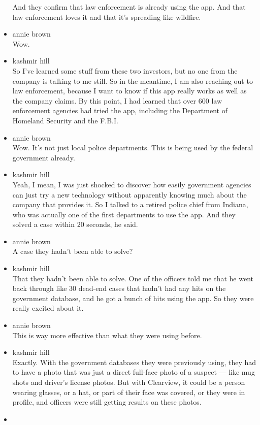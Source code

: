 \begin{itemize}
  And they confirm that law enforcement is already using the app. And
  that law enforcement loves it and that it's spreading like wildfire.
\item
  annie brown\\
  Wow.
\item
  kashmir hill\\
  So I've learned some stuff from these two investors, but no one from
  the company is talking to me still. So in the meantime, I am also
  reaching out to law enforcement, because I want to know if this app
  really works as well as the company claims. By this point, I had
  learned that over 600 law enforcement agencies had tried the app,
  including the Department of Homeland Security and the F.B.I.
\item
  annie brown\\
  Wow. It's not just local police departments. This is being used by the
  federal government already.
\item
  kashmir hill\\
  Yeah, I mean, I was just shocked to discover how easily government
  agencies can just try a new technology without apparently knowing much
  about the company that provides it. So I talked to a retired police
  chief from Indiana, who was actually one of the first departments to
  use the app. And they solved a case within 20 seconds, he said.
\item
  annie brown\\
  A case they hadn't been able to solve?
\item
  kashmir hill\\
  That they hadn't been able to solve. One of the officers told me that
  he went back through like 30 dead-end cases that hadn't had any hits
  on the government database, and he got a bunch of hits using the app.
  So they were really excited about it.
\item
  annie brown\\
  This is way more effective than what they were using before.
\item
  kashmir hill\\
  Exactly. With the government databases they were previously using,
  they had to have a photo that was just a direct full-face photo of a
  suspect --- like mug shots and driver's license photos. But with
  Clearview, it could be a person wearing glasses, or a hat, or part of
  their face was covered, or they were in profile, and officers were
  still getting results on these photos.
\item

\end{itemize}
